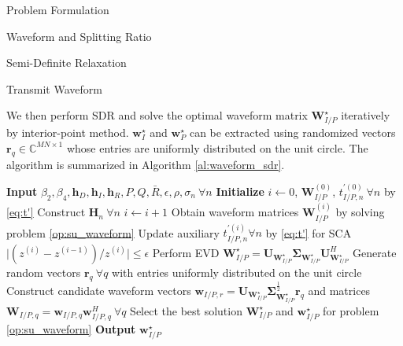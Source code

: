 \documentclass{IEEEtran}
\begin{document}
\begin{section}{Problem Formulation}
\begin{subsection}{Waveform and Splitting Ratio}
\begin{subsubsection}{Semi-Definite Relaxation}
\begin{paragraph}{Transmit Waveform}
\begin{maxi!}
				\end{maxi!}
				We then perform SDR and solve the optimal waveform matrix $\boldsymbol{W}_{I/P}^{\star}$ iteratively by interior-point method. $\boldsymbol{w}_I^{\star}$ and $\boldsymbol{w}_P^{\star}$ can be extracted using randomized vectors $\boldsymbol{r}_q \in \mathbb{C}^{MN \times 1}$ whose entries are uniformly distributed on the unit circle. The algorithm is summarized in Algorithm \ref{al:waveform_sdr}.
				\begin{algorithm}
					\caption{SDR: Transmit Waveform}
					\label{al:waveform_sdr}
					\begin{algorithmic}[1]
						\State \textbf{Input} $\beta_2,\beta_4,\boldsymbol{h}_D,\boldsymbol{h}_I,\boldsymbol{h}_R,P,Q,\bar{R},\epsilon,\rho,\sigma_n \ \forall n$
						\State \textbf{Initialize} $i \gets 0$, $\boldsymbol{W}_{I/P}^{(0)}$, $t_{I/P,n}^{\prime (0)} \ \forall n$ by \ref{eq:t'}
						\State Construct $\boldsymbol{H}_n \ \forall n$
						\Repeat
						\State $i \gets i + 1$
						\State Obtain waveform matrices $\boldsymbol{W}_{I/P}^{(i)}$ by solving problem \ref{op:su_waveform}
						\State Update auxiliary $t_{I/P,n}^{\prime (i)} \forall n$ by \ref{eq:t'} for SCA
						\Until $\lvert (z^{(i)}-z^{(i-1)}) / z^{(i)} \rvert \le \epsilon$
						\State Perform EVD $\boldsymbol{W}_{I/P}^{\star}=\boldsymbol{U}_{\boldsymbol{W}_{I/P}^{\star}}\boldsymbol{\Sigma}_{\boldsymbol{W}_{I/P}^{\star}}\boldsymbol{U}_{\boldsymbol{W}_{I/P}^{\star}}^H$
						\State Generate random vectors $\boldsymbol{r}_q \ \forall q$ with entries uniformly distributed on the unit circle
						\State Construct candidate waveform vectors $\boldsymbol{w}_{I/P,r}=\boldsymbol{U}_{\boldsymbol{W}_{I/P}^{\star}}\boldsymbol{\Sigma}_{\boldsymbol{W}_{I/P}^{\star}}^{\frac{1}{2}}\boldsymbol{r}_q$ and matrices $\boldsymbol{W}_{I/P,q}=\boldsymbol{w}_{I/P,q}\boldsymbol{w}_{I/P,q}^H  \ \forall q$
						\State Select the best solution $\boldsymbol{W}_{I/P}^\star$ and $\boldsymbol{w}_{I/P}^\star$ for problem \ref{op:su_waveform}
						\State \textbf{Output} $\boldsymbol{w}_{I/P}^\star$
					\end{algorithmic}
				\end{algorithm}
			\end{paragraph}


\end{subsubsection}
\end{subsection}
\end{section}
\end{document}
